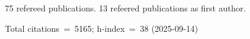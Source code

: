 75 refereed publications. 13 refeered publications as first author.

Total citations~=~5165; h-index~=~38 (2025-09-14)